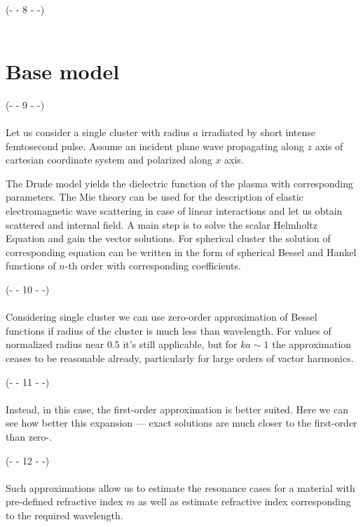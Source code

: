 \\\noindent(- - 8 - -)\\~\\
\section{Base model}

\noindent(- - 9 - -)\\~\\
Let us consider a single cluster with radius $a$ irradiated by short intense femtosecond pulse. Assume an incident plane wave propagating along $z$ axis of cartesian coordinate system and polarized along $x$ axis.

The Drude model yields the dielectric function of the plasma with corresponding parameters. The Mie theory can be used for the description of elastic electromagnetic wave scattering in case of linear interactions and let us obtain scattered and internal field. A main step is to solve the scalar Helmholtz Equation and gain the vector solutions. For spherical cluster the solution of corresponding equation can be written in the form of spherical Bessel and Hankel functions of $n$-th order with corresponding coefficients.

\noindent(- - 10 - -)\\~\\
Considering single cluster we can use zero-order approximation of Bessel functions if radius of the cluster is much less than wavelength. For values of normalized radius near $0.5$ it's still applicable, but for $ka \sim 1$ the approximation ceases to be reasonable already, particularly for large orders of vactor harmonics. 

\noindent(- - 11 - -)\\~\\
Instead, in this case, the first-order approximation is better suited. Here we can see how better this expansion --- exact solutions are much closer to the first-order than zero-.

\noindent(- - 12 - -)\\~\\
Such approximations allow us to estimate the resonance cases for a material with pre-defined refractive index $m$ as well as estimate refractive index corresponding to the required wavelength.



